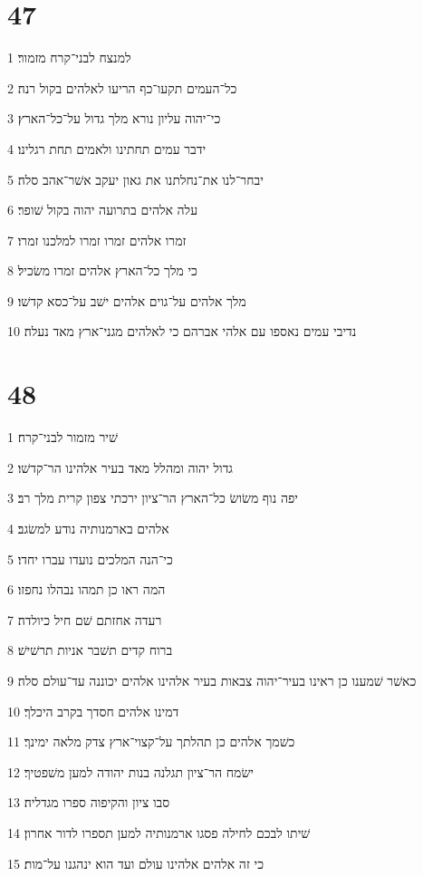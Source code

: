 \chapter{47}

\par 1 למנצח לבני־קרח מזמור׃
\par 2 כל־העמים תקעו־כף הריעו לאלהים בקול רנה׃
\par 3 כי־יהוה עליון נורא מלך גדול על־כל־הארץ׃
\par 4 ידבר עמים תחתינו ולאמים תחת רגלינו׃
\par 5 יבחר־לנו את־נחלתנו את גאון יעקב אשׁר־אהב סלה׃
\par 6 עלה אלהים בתרועה יהוה בקול שׁופר׃
\par 7 זמרו אלהים זמרו זמרו למלכנו זמרו׃
\par 8 כי מלך כל־הארץ אלהים זמרו משׂכיל׃
\par 9 מלך אלהים על־גוים אלהים ישׁב על־כסא קדשׁו׃
\par 10 נדיבי עמים נאספו עם אלהי אברהם כי לאלהים מגני־ארץ מאד נעלה׃

\chapter{48}

\par 1 שׁיר מזמור לבני־קרח׃
\par 2 גדול יהוה ומהלל מאד בעיר אלהינו הר־קדשׁו׃
\par 3 יפה נוף משׂושׂ כל־הארץ הר־ציון ירכתי צפון קרית מלך רב׃
\par 4 אלהים בארמנותיה נודע למשׂגב׃
\par 5 כי־הנה המלכים נועדו עברו יחדו׃
\par 6 המה ראו כן תמהו נבהלו נחפזו׃
\par 7 רעדה אחזתם שׁם חיל כיולדה׃
\par 8 ברוח קדים תשׁבר אניות תרשׁישׁ׃
\par 9 כאשׁר שׁמענו כן ראינו בעיר־יהוה צבאות בעיר אלהינו אלהים יכוננה עד־עולם סלה׃
\par 10 דמינו אלהים חסדך בקרב היכלך׃
\par 11 כשׁמך אלהים כן תהלתך על־קצוי־ארץ צדק מלאה ימינך׃
\par 12 ישׂמח הר־ציון תגלנה בנות יהודה למען משׁפטיך׃
\par 13 סבו ציון והקיפוה ספרו מגדליה׃
\par 14 שׁיתו לבכם לחילה פסגו ארמנותיה למען תספרו לדור אחרון׃
\par 15 כי זה אלהים אלהינו עולם ועד הוא ינהגנו על־מות׃

